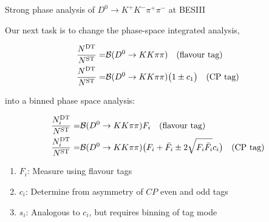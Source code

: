 \documentclass{beamer}
\begin{document}
\begin{frame}{Strong phase analysis of $D^0\to K^+K^-\pi^+\pi^-$ at BESIII}
  \begin{center}
    Our next task is to change the phase-space integrated analysis,
  \end{center}
  \vspace{-0.5cm}
  \begin{align*}
    \frac{N^{\rm DT}}{N^{\rm ST}} =& \mathcal{B}(D^0\to KK\pi\pi)\quad\textnormal{(flavour tag)} \\
    \frac{N^{\rm DT}}{N^{\rm ST}} =& \mathcal{B}(D^0\to KK\pi\pi)\big(1\pm c_1\big)\quad\textnormal{(CP tag)}
  \end{align*}
  \vspace{-1.0cm}
  \begin{center}
    into a binned phase space analysis:
  \end{center}
  \vspace{-0.6cm}
  \begin{align*}
    \frac{N^{\rm DT}_i}{N^{\rm ST}} =& \mathcal{B}(D^0\to KK\pi\pi)F_i\quad\textnormal{(flavour tag)} \\
    \frac{N^{\rm DT}_i}{N^{\rm ST}} =& \mathcal{B}(D^0\to KK\pi\pi)\big(F_i + \bar{F_i} \pm 2\sqrt{F_i\bar{F_i}}c_i\big)\quad\textnormal{(CP tag)}
  \end{align*}
  \vspace{-0.6cm}
  \begin{enumerate}
    \item{$F_i$: Measure using flavour tags}
    \item{$c_i$: Determine from asymmetry of $C\!P$ even and odd tags}
    \item{$s_i$: Analogous to $c_i$, but requires binning of tag mode}
  \end{enumerate}
  \vspace{-7.0cm}
  \begin{center}
  \end{center}
\end{frame}
\end{document}
